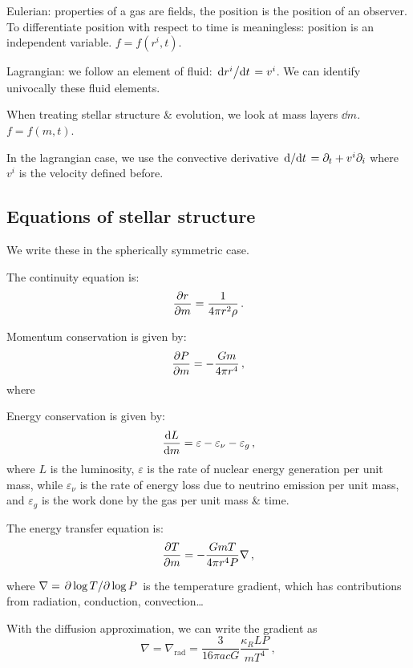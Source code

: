 \documentclass[main.tex]{subfiles}
\begin{document}
Eulerian: properties of a gas are fields, the position is the position of an observer.
To differentiate position with respect to time is meaningless: position is an independent variable. \(f = f(r^i, t)\).

Lagrangian: we follow an element of fluid: \(\dv*{r^i}{t} = v^i \). We can identify univocally these fluid elements.

When treating stellar structure \& evolution, we look at mass layers \(\dd{m}\).  \(f = f(m, t)\).

In the lagrangian case, we use the convective derivative \(\dv*{}{t} = \partial_t + v^i \partial_i\) where \(v^i\) is the velocity defined before.

\subsection{Equations of stellar structure}

We write these in the spherically symmetric case.

The continuity equation is:
%
\begin{equation}
    \pdv{r}{m} = \frac{1}{4 \pi r^2 \rho} \,.
\end{equation}

Momentum conservation is given by:
%
\begin{equation}
    \pdv{P}{m} = - \frac{Gm}{4 \pi r^4}\,,
\end{equation}
%
where

Energy conservation is given by:
%
\begin{equation}
    \dv{L}{m} = \varepsilon - \varepsilon_\nu - \varepsilon_g \,,
\end{equation}
%
where \(L\) is the luminosity, \(\varepsilon\) is the rate of nuclear energy generation per unit mass, while \(\varepsilon_\nu\) is the rate of energy loss due to neutrino emission per unit mass, and \(\varepsilon_g \) is the work done by the gas per unit mass \& time.

The energy transfer equation is:
%
\begin{equation}
    \pdv{T}{m} = - \frac{GmT}{4 \pi r^4 P} \nabla \,,
\end{equation}

where \(\nabla = \pdv*{\log T}{\log P} \) is the temperature gradient, which has contributions from radiation, conduction, convection\dots

With the diffusion approximation, we can write the gradient as
%
\begin{equation} \label{eq:diffusion-approx-gradient}
    \nabla = \nabla_{\text{rad}} = \frac{3}{16 \pi a c G} \frac{\kappa_R L P}{mT^4} \,,
\end{equation}
\end{document}
